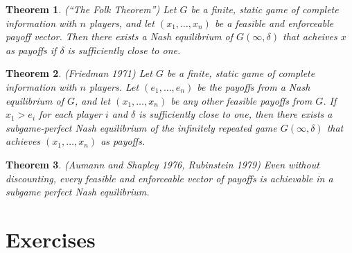 \documentclass[letter, 10pt]{article}
\theoremstyle{basic}
\newtheorem{theorem}{Theorem}[section]
\begin{document}
\begin{spacing}{1.0}
\begin{theorem}
  (``The Folk Theorem'') Let $G$ be a finite, static game of complete
  information with $n$ players, and let $(x_1, \ldots, x_n)$ be a feasible
  and enforceable payoff vector. Then there exists a Nash equilibrium of
  $G(\infty, \delta)$ that acheives $x$ as payoffs if $\delta$ is
  sufficiently close to one.
\end{theorem}

\begin{theorem}
  (Friedman 1971) Let $G$ be a finite, static game of
  complete information with $n$ players. Let $(e_1,
  \ldots, e_n)$ be the payoffs from a Nash equilibrium of
  $G$, and let $(x_1, \ldots, x_n)$ be any other feasible
  payoffs from $G$. If $x_1 > e_i$ for each player $i$
  and $\delta$ is sufficiently close to one, then there
  exists a subgame-perfect Nash equilibrium of the
  infinitely repeated game $G(\infty, \delta)$ that
  achieves $(x_1, \ldots, x_n)$ as payoffs.
\end{theorem}

\begin{theorem}
  (Aumann and Shapley 1976, Rubinstein 1979) Even without discounting,
  every feasible and enforceable vector of payoffs is achievable in a
  subgame perfect Nash equilibrium.
\end{theorem}

\newpage
\section{Exercises}


\end{spacing}
\end{document}

